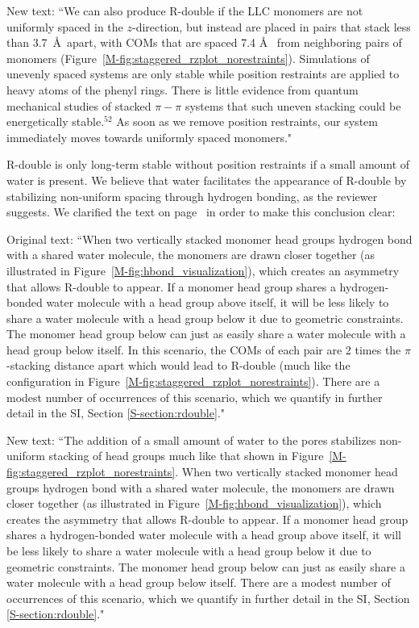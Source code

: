 \documentclass{article}
\begin{document}
\begin{enumerate}
    New text: ``We can also produce R-double if the LLC monomers are not
    uniformly spaced in the $z$-direction, but instead are placed in pairs that
    stack less than 3.7~\AA~apart, with COMs that are spaced 7.4 \AA~ from
    neighboring pairs of monomers (Figure~\ref{M-fig:staggered_rzplot_norestraints}).
    Simulations of unevenly spaced systems are only stable while position
    restraints are applied to heavy atoms of the phenyl rings. There is little
    evidence from quantum mechanical studies of stacked $\pi-\pi$ systems that such
    uneven stacking could be energetically stable.$^{52}$ As soon %
    as we remove position restraints, our system immediately moves towards uniformly spaced
    monomers."

    R-double is only long-term stable without position restraints if a small
    amount of water is present. We believe that water facilitates the appearance
    of R-double by stabilizing non-uniform spacing through hydrogen bonding, as the
    reviewer suggests. We clarified the text on page~\pageref{M-modification:rdouble2}
    in order to make this conclusion clear:

    Original text: ``When two vertically stacked monomer head groups hydrogen bond
    with a shared water molecule, the monomers are drawn closer together (as
    illustrated in Figure~\ref{M-fig:hbond_visualization}), which creates an
    asymmetry that allows R-double to appear. If a monomer head group shares a
    hydrogen-bonded water molecule with a head group above itself, it will be less
    likely to share a water molecule with a head group below it due to geometric
    constraints. The monomer head group below can just as easily share a water
    molecule with a head group below itself. In this scenario, the COMs of each
    pair are 2 times the $\pi$-stacking distance apart which would lead to R-double
    (much like the configuration in
     Figure~\ref{M-fig:staggered_rzplot_norestraints}). There are a modest number of
    occurrences of this scenario, which we quantify in further detail in the SI,
    Section \ref{S-section:rdouble}."

    New text: ``The addition of a small amount of water to the pores stabilizes
    non-uniform stacking of head groups much like that shown in
    Figure~\ref{M-fig:staggered_rzplot_norestraints}. When two vertically stacked
    monomer head groups hydrogen bond with a shared water molecule, the monomers
    are drawn closer together (as illustrated in
    Figure~\ref{M-fig:hbond_visualization}), which creates the asymmetry that allows
    R-double to appear. If a monomer head group shares a hydrogen-bonded water
    molecule with a head group above itself, it will be less likely to share a
    water molecule with a head group below it due to geometric constraints. The
    monomer head group below can just as easily share a water molecule with a head
    group below itself. There are a modest number of occurrences of this scenario,
    which we quantify in further detail in the SI, Section
    \ref{S-section:rdouble}."


\end{enumerate}
\end{document}

